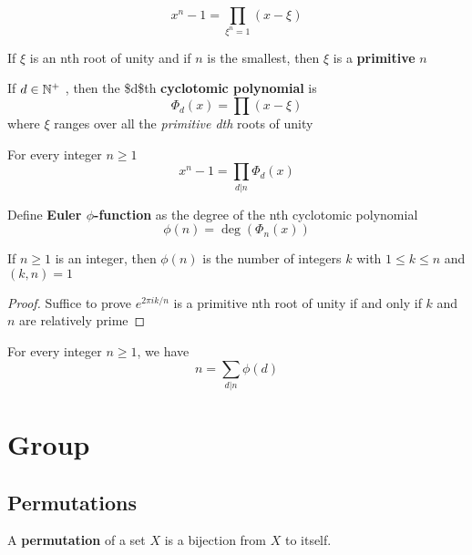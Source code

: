 \documentclass[11pt]{article}
\begin{document}
\begin{equation*}
x^n-1=\displaystyle\prod_{\xi^n=1}(x-\xi)
\end{equation*}

If \(\xi\) is an nth root of unity and if \(n\) is the smallest, then \(\xi\) is a
\textbf{primitive} \(n\)

\begin{definition}[]
If \(d\in\mathbb{N}^+\) , then the \$d\$th \textbf{cyclotomic polynomial} is 
\begin{equation*}
\Phi_d(x)=\displaystyle\prod(x-\xi)
\end{equation*}
where \(\xi\) ranges over all the \emph{primitive dth} roots of unity
\end{definition}

\begin{proposition}[]
For every integer \(n\ge 1\)
\begin{equation*}
x^n-1=\displaystyle\prod_{d|n}\Phi_d(x)
\end{equation*}
\end{proposition}

\begin{definition}[]
Define \textbf{Euler \(\phi\)-function} as the degree of the nth cyclotomic
polynomial
\begin{equation*}
\phi(n)=\deg(\Phi_n(x))
\end{equation*}
\end{definition}

\begin{proposition}[]
If \(n\ge1\) is an integer, then \(\phi(n)\) is the number of integers \(k\) with
\(1\le k\le n\) and \((k,n)=1\)
\end{proposition}

\begin{proof}
Suffice to prove \(e^{2\pi ik/n}\) is a primitive nth root of unity if and only
if \(k\) and \(n\) are relatively prime
\end{proof}

\begin{corollary}[]
For every integer \(n\ge 1\), we have
\begin{equation*}
n=\displaystyle\sum_{d|n}\phi(d)
\end{equation*}
\end{corollary}
\section{Group }
\label{sec:org548b650}
\subsection{Permutations}
\label{sec:orgaa6d276}
\begin{definition}[]
A \textbf{permutation} of a set \(X\) is a bijection from \(X\) to itself.
\end{definition}
\end{document}
